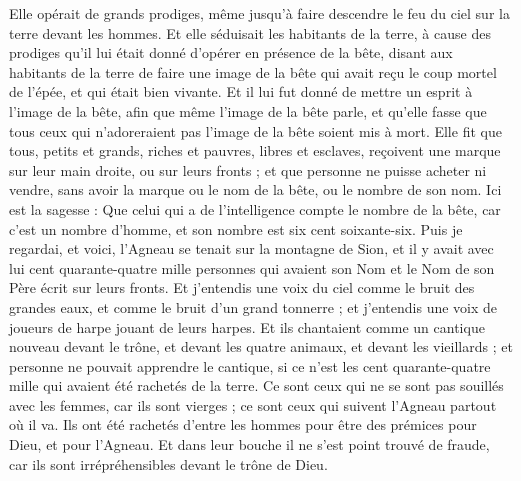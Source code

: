 \begin{multicols}{2}
Elle opérait de grands prodiges, même jusqu'à faire descendre le feu du ciel sur la terre devant les hommes.
Et elle séduisait les habitants de la terre, à cause des prodiges qu'il lui était donné d’opérer en présence de la bête, disant aux habitants de la terre de faire une image{} de la bête qui avait reçu le coup mortel de l'épée, et qui était bien vivante.
Et il lui fut donné de mettre un esprit à l'image de la bête, afin que même l'image de la bête parle, et qu'elle fasse que tous ceux qui n’adoreraient pas l'image de la bête soient mis à mort.
Elle fit que tous, petits et grands, riches et pauvres, libres et esclaves, reçoivent une marque sur leur main droite, ou sur leurs fronts{} ;
et que personne ne puisse acheter ni vendre, sans avoir la marque ou le nom de la bête, ou le nombre de son nom.
Ici est la sagesse : Que celui qui a de l'intelligence compte le nombre de la bête, car c'est un nombre d'homme, et son nombre est six cent soixante-six.
\VerseOne{}Puis je regardai, et voici, l'Agneau se tenait sur la montagne de Sion, et il y avait avec lui cent quarante-quatre mille personnes qui avaient son Nom et le Nom de son Père écrit sur leurs fronts.
Et j'entendis une voix du ciel comme le bruit des grandes eaux, et comme le bruit d'un grand tonnerre ; et j'entendis une voix de joueurs de harpe jouant de leurs harpes.
Et ils chantaient comme un cantique nouveau devant le trône, et devant les quatre animaux, et devant les vieillards ; et personne ne pouvait apprendre le cantique, si ce n’est les cent quarante-quatre mille qui avaient été rachetés de la terre.
Ce sont ceux qui ne se sont pas souillés avec les femmes, car ils sont vierges ; ce sont ceux qui suivent l'Agneau partout où il va. Ils ont été rachetés d'entre les hommes pour être des prémices pour Dieu, et pour l'Agneau.
Et dans leur bouche il ne s’est point trouvé de fraude, car ils sont irrépréhensibles devant le trône de Dieu{}.

\end{multicols}
